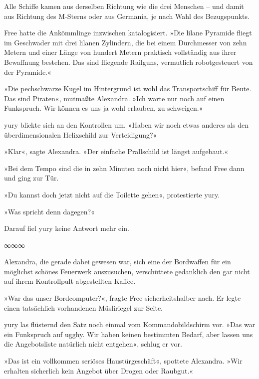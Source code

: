 Alle Schiffe kamen aus derselben Richtung wie die drei Menschen – und damit aus Richtung des M-Sterns oder aus Germania, je nach Wahl des Bezugspunkts.

Free hatte die Ankömmlinge inzwischen katalogisiert. »Die lilane Pyramide fliegt im Geschwader mit drei lilanen Zylindern, die bei einem Durchmesser von zehn Metern und einer Länge von hundert Metern praktisch vollständig aus ihrer Bewaffnung bestehen. Das sind fliegende Railguns, vermutlich robotgesteuert von der Pyramide.«

»Die pechschwarze Kugel im Hintergrund ist wohl das Transportschiff für Beute. Das sind Piraten«, mutmaßte Alexandra. »Ich warte nur noch auf einen Funkspruch. Wir können es uns ja wohl erlauben, zu schweigen.«

yury blickte sich an den Kontrollen um. »Haben wir noch etwas anderes als den überdimensionalen Helixschild zur Verteidigung?«

»Klar«, sagte Alexandra. »Der einfache Prallschild ist längst aufgebaut.«

»Bei dem Tempo sind die in zehn Minuten noch nicht hier«, befand Free dann und ging zur Tür.

»Du kannst doch jetzt nicht auf die Toilette gehen«, protestierte yury.

»Was spricht denn dagegen?«

Darauf fiel yury keine Antwort mehr ein.

\begin{center}
	∞∞∞
\end{center}


Alexandra, die gerade dabei gewesen war, sich eine der Bordwaffen für ein möglichst schönes Feuerwerk auszusuchen, verschüttete gedanklich den gar nicht auf ihrem Kontrollpult abgestellten Kaffee.

»War das unser Bordcomputer?«, fragte Free sicherheitshalber nach. Er legte einen tatsächlich vorhandenen Müsliriegel zur Seite.

yury las flüsternd den Satz noch einmal vom Kommandobildschirm vor. »Das war ein Funkspruch auf ugghy. Wir haben keinen bestimmten Bedarf, aber lassen uns die Angebotsliste natürlich nicht entgehen«, schlug er vor.

»Das ist ein vollkommen seriöses Haustürgeschäft«, spottete Alexandra. »Wir erhalten sicherlich kein Angebot über Drogen oder Raubgut.«

